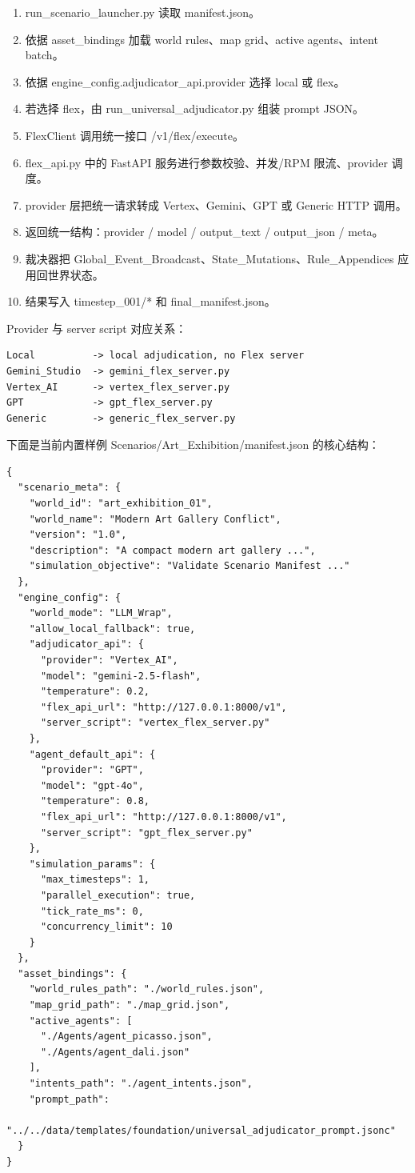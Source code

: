 \documentclass[11pt,a4paper]{article}
\newcommand{\sect}[1]{\vspace{8pt}{\sectionfont #1}\par}
\newcommand{\code}[1]{{\smallmono #1}}
\begin{document}
\begin{enumerate}
\item \code{run\_scenario\_launcher.py} 读取 \code{manifest.json}。
\item 依据 \code{asset\_bindings} 加载 world rules、map grid、active agents、intent batch。
\item 依据 \code{engine\_config.adjudicator\_api.provider} 选择 \code{local} 或 \code{flex}。
\item 若选择 \code{flex}，由 \code{run\_universal\_adjudicator.py} 组装 prompt JSON。
\item \code{FlexClient} 调用统一接口 \code{/v1/flex/execute}。
\item \code{flex\_api.py} 中的 FastAPI 服务进行参数校验、并发/RPM 限流、provider 调度。
\item provider 层把统一请求转成 Vertex、Gemini、GPT 或 Generic HTTP 调用。
\item 返回统一结构：\code{provider / model / output\_text / output\_json / meta}。
\item 裁决器把 \code{Global\_Event\_Broadcast}、\code{State\_Mutations}、\code{Rule\_Appendices} 应用回世界状态。
\item 结果写入 \code{timestep\_001/*} 和 \code{final\_manifest.json}。
\end{enumerate}

Provider 与 server script 对应关系：

\begin{verbatim}
Local          -> local adjudication, no Flex server
Gemini_Studio  -> gemini_flex_server.py
Vertex_AI      -> vertex_flex_server.py
GPT            -> gpt_flex_server.py
Generic        -> generic_flex_server.py
\end{verbatim}

\sect{3. 场景 Manifest 示例}
下面是当前内置样例 \code{Scenarios/Art\_Exhibition/manifest.json} 的核心结构：

\begin{verbatim}
{
  "scenario_meta": {
    "world_id": "art_exhibition_01",
    "world_name": "Modern Art Gallery Conflict",
    "version": "1.0",
    "description": "A compact modern art gallery ...",
    "simulation_objective": "Validate Scenario Manifest ..."
  },
  "engine_config": {
    "world_mode": "LLM_Wrap",
    "allow_local_fallback": true,
    "adjudicator_api": {
      "provider": "Vertex_AI",
      "model": "gemini-2.5-flash",
      "temperature": 0.2,
      "flex_api_url": "http://127.0.0.1:8000/v1",
      "server_script": "vertex_flex_server.py"
    },
    "agent_default_api": {
      "provider": "GPT",
      "model": "gpt-4o",
      "temperature": 0.8,
      "flex_api_url": "http://127.0.0.1:8000/v1",
      "server_script": "gpt_flex_server.py"
    },
    "simulation_params": {
      "max_timesteps": 1,
      "parallel_execution": true,
      "tick_rate_ms": 0,
      "concurrency_limit": 10
    }
  },
  "asset_bindings": {
    "world_rules_path": "./world_rules.json",
    "map_grid_path": "./map_grid.json",
    "active_agents": [
      "./Agents/agent_picasso.json",
      "./Agents/agent_dali.json"
    ],
    "intents_path": "./agent_intents.json",
    "prompt_path":
      "../../data/templates/foundation/universal_adjudicator_prompt.jsonc"
  }
}
\end{verbatim}
\end{document}
